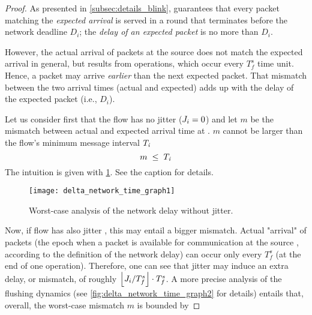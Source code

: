\begin{proof}%
As presented in \cref{subsec:details_blink}, \blink guarantees that every packet matching the \emph{expected arrival} is served in a round that terminates before the network deadline $D_i$; \ie the \emph{delay of an expected packet} is no more than $D_i$.

However, the actual arrival of packets at the source \cpsrc does not match the expected arrival in general, but results from \opflush operations, which occur every $T_f^s$ time unit.
Hence, a packet may arrive \emph{earlier} than the next expected packet. That mismatch between the two arrival times (actual and expected) adds up with the delay of the expected packet (i.e., $D_i$).

Let us consider first that the flow \flowi has no jitter (\ie $\jitteri =0$) and let $m$ be the mismatch between actual and expected arrival time at \cpsrc. $m$ cannot be larger than the flow's minimum message interval $\periodi$
\[
m \;\leq\; \periodi
\]
The intuition is given with \cref{fig:delta_network_time_graph1}. See the caption for details.

\begin{figure}[h!]
\centering
\texttt{[image: delta\_network\_time\_graph1]}
\caption{Worst-case analysis of the network delay without jitter.
}
\label{fig:delta_network_time_graph1}
\end{figure}


Now, if flow \flowi has also jitter \jitteri, this may entail a bigger mismatch. Actual "arrival" of packets (\ie the epoch when a packet is available for communication at the source \cpsrc, according to the definition of the network delay) can occur only every $T_f^s$ (\ie at the end of one \opflush operation). Therefore, one can see that jitter may induce an extra delay, or mismatch, of roughly $\floor*{\jitteri/T_f^s}\cdot T_f^s$. A more precise analysis of the flushing dynamics (see \cref{fig:delta_network_time_graph2} for details) entails that, overall, the worst-case mismatch $m$ is bounded by


\end{proof}
